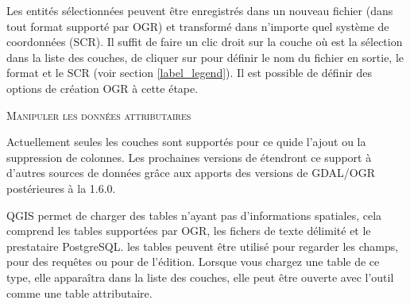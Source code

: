 
Les entités sélectionnées peuvent être enregistrés dans un nouveau fichier (dans tout format supporté par OGR) et transformé dans n'importe quel système de coordonnées (SCR). Il suffit de faire un clic droit sur la couche où est la sélection dans la liste des couches, de cliquer sur  pour définir le nom du fichier en sortie, le format et le SCR (voir section \ref{label_legend}). Il est possible de définir des options de création OGR à cette étape.

\begin{Tip}[ht]\caption{\textsc{Manipuler les données attributaires}}
Actuellement seules les couches \pg sont supportés pour ce quide l'ajout ou la suppression de colonnes. Les prochaines versions de \qg étendront ce support à d'autres sources de données grâce aux apports des versions de GDAL/OGR postérieures à la 1.6.0.
\end{Tip}


QGIS permet de charger des tables n'ayant pas d'informations spatiales, cela comprend les tables supportées par OGR, les fichers de texte délimité et le prestataire PostgreSQL. les tables peuvent être utilisé pour regarder les champs, pour des requêtes ou pour de l'édition. Lorsque vous chargez une table de ce type, elle apparaîtra dans la liste des couches, elle peut être ouverte avec l'outil  comme une table attributaire.

